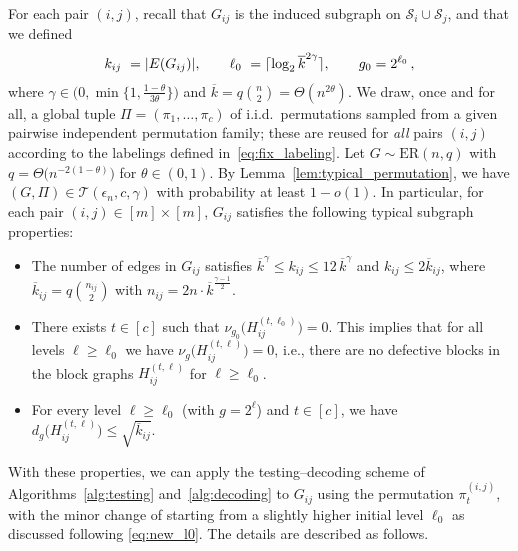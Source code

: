 \documentclass[journal]{IEEEtran}
\theoremstyle{definition}
\theoremstyle{definition}
\newcommand{\Tc}{\mathcal{T}}
\newcommand{\ER}{\mathrm{ER}}
\newcommand{\PV}{\nu}
\newcommand{\kb}{\overline{k}}
\DeclarePairedDelimiter\ceil{\lceil}{\rceil}
\begin{document}
For each pair \((i,j)\), recall that \(G_{ij}\) is the induced subgraph on \(\mathcal{S}_i\cup \mathcal{S}_j\), and that we defined
\begin{align*}
  k_{ij}\ = |E(G_{ij})|, \qquad \ell_0\ = \ceil{\log_2 \kb^{2\gamma}}, \qquad g_0 = 2^{\ell_0} \, ,
\end{align*}
where \(\gamma\in\big(0, \min \{1, \tfrac{1-\theta}{3\theta} \}\big)\) and \(\kb = q \binom{n}{2} = \Theta(n^{2\theta})\). We draw, once and for all, a global tuple $\Pi=(\pi_1,\dots,\pi_c)$ of i.i.d.\ permutations sampled from a given pairwise independent permutation family; these are reused for \emph{all} pairs $(i,j)$ according to the labelings defined in~\eqref{eq:fix_labeling}. Let $G \sim \ER(n,q)$ with $q = \Theta \big(n^{-2(1-\theta)}\big)$ for $\theta \in (0,1)$.  By Lemma~\ref{lem:typical_permutation}, we have $(G,\Pi) \in \Tc(\epsilon_n,c,\gamma)$ with probability at least $1-o(1)$. In particular, for each pair $(i,j) \in [m]\times[m]$, $G_{ij}$ satisfies the following typical subgraph properties:
\begin{itemize}
    \item The number of edges in $G_{ij}$ satisfies $\kb^{\gamma} \le k_{ij}  \le 12\,\kb^{\gamma}$ and $k_{ij} \le 2\kb_{ij}$, where $\kb_{ij} = q\binom{n_{ij}}{2}$ with $n_{ij} =2n \cdot \kb^{\frac{\gamma-1}{2}}$.
    \item There exists $t\in [c]$ such that $\PV_{g_0} \big(H_{ij}^{(t,\ell_0)}\big)=0$. 
    This implies that for all levels $\ell \ge \ell_0$ we have $\PV_g \big(H_{ij}^{(t,\ell)}\big)=0$, i.e., there are no defective blocks in the block graphs $H_{ij}^{(t,\ell)}$ for $\ell \ge \ell_0$.
    \item For every level $\ell \ge \ell_0$ (with $g=2^{\ell}$) and $t \in [c]$, we have $d_g \big(H_{ij}^{(t,\ell)}\big) \le \sqrt{\kb_{ij}}$.
\end{itemize}
With these properties, we can apply the testing–decoding scheme of Algorithms~\ref{alg:testing} and~\ref{alg:decoding} to $G_{ij}$ using the permutation $\pi_t^{(i,j)}$, with the minor change of starting from a slightly higher initial level $\ell_0$ as discussed following \eqref{eq:new_l0}.  The details are described as follows.
\end{document}
